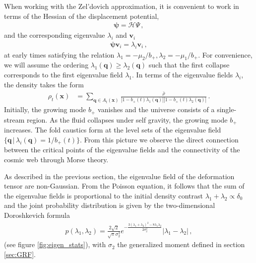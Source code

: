 \documentclass[a4paper, 11pt]{article}
\begin{document}
When working with the Zel'dovich approximation, it is convenient to work in terms of the Hessian of the displacement potential,
\begin{align}
\bm{\psi}=\mathcal{H}\Psi\,,
\end{align}
and the corresponding eigenvalue $\lambda_i$ and $\bm{v}_i$
\begin{align}
\bm{\psi}\bm{v}_i = \lambda_i \bm{v}_i\,,
\end{align} 
at early times satisfying the relation $\lambda_1 =-\mu_2/b_+,\lambda_2 =-\mu_1/b_+$. For convenience, we will assume the ordering $\lambda_1(\bm{q}) \geq \lambda_2(\bm{q})$ such that the first collapse corresponds to the first eigenvalue field $\lambda_1$. In terms of the eigenvalue fields $\lambda_i$, the density takes the form 
\begin{align}
\rho_t(\bm{x})
&= \sum_{\bm{q} \in A_t(\bm{x})} \frac{\bar{\rho}}{|1-b_+(t) \lambda_1(\bm{q})||1-b_+(t) \lambda_2(\bm{q})|}\,.
\end{align}
Initially, the growing mode $b_+$ vanishes and the universe consists of a single-stream region. As the fluid collapses under self gravity, the growing mode $b_+$ increases. The fold caustics form at the level sets of the eigenvalue field $\{\bm{q}\,|\,\lambda_i(\bm{q})=1/b_+(t)\}$. From this picture we observe the direct connection between the critical points of the eigenvalue fields and the connectivity of the cosmic web through Morse theory.

As described in the previous section, the eigenvalue field of the deformation tensor are non-Gaussian. From the Poisson equation, it follows that the sum of the eigenvalue fields is proportional to the initial density contrast $\lambda_1+\lambda_2 \propto \delta_0$ and the joint probability distribution is given by the two-dimensional Doroshkevich formula \cite{Doroshkevich:1970, Feldbrugge:2014}
\begin{align}
p(\lambda_1,\lambda_2) = \frac{2\sqrt{2}}{\sqrt{\pi} \sigma_2^3} e^{-\frac{3(\lambda_1+\lambda_2)^2-8\lambda_1 \lambda_2}{2 \sigma_2^2}}|\lambda_1-\lambda_2|\,,
\end{align}
(see figure \ref{fig:eigen_stats}), with $\sigma_2$ the generalized moment defined in section \ref{sec:GRF}.
\end{document}
